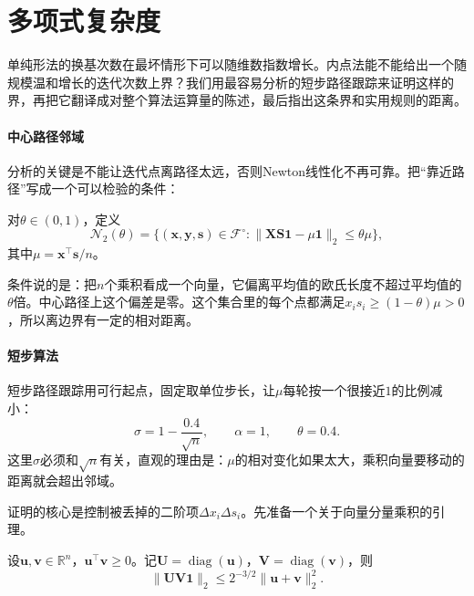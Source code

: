 \section{多项式复杂度}
\label{sec:lpipm-complexity}

单纯形法的换基次数在最坏情形下可以随维数指数增长。内点法能不能给出一个随规模温和增长的迭代次数上界？我们用最容易分析的短步路径跟踪来证明这样的界，再把它翻译成对整个算法运算量的陈述，最后指出这条界和实用规则的距离。

\paragraph{中心路径邻域}
分析的关键是不能让迭代点离路径太远，否则Newton线性化不再可靠。把“靠近路径”写成一个可以检验的条件：

\begin{definition}
\label{def:lpipm-neighborhood}
对$\theta\in(0,1)$，定义
\begin{equation}
 \mathcal{N}_2(\theta)=\bigl\{(\bm{x},\bm{y},\bm{s})\in\mathcal{F}^{\circ}:\lVert\bm{X}\bm{S}\bm{1}-\mu\bm{1}\rVert_2\leq\theta\mu\bigr\},
 \label{eq:lpipm-n2}
\end{equation}
其中$\mu=\bm{x}^\top\bm{s}/n$。
\end{definition}

条件说的是：把$n$个乘积看成一个向量，它偏离平均值的欧氏长度不超过平均值的$\theta$倍。中心路径上这个偏差是零。这个集合里的每个点都满足$x_is_i\geq(1-\theta)\mu>0$，所以离边界有一定的相对距离。

\paragraph{短步算法}
短步路径跟踪用可行起点，固定取单位步长，让$\mu$每轮按一个很接近$1$的比例减小：
\begin{equation}
 \sigma=1-\frac{0.4}{\sqrt{n}},\qquad\alpha=1,\qquad\theta=0.4.
 \label{eq:lpipm-short-step}
\end{equation}
这里$\sigma$必须和$\sqrt{n}$有关，直观的理由是：$\mu$的相对变化如果太大，乘积向量要移动的距离就会超出邻域。

证明的核心是控制被丢掉的二阶项$\Delta x_i\Delta s_i$。先准备一个关于向量分量乘积的引理。

\begin{lemma}[分量乘积的界]
\label{lem:lpipm-product-bound}
设$\bm{u},\bm{v}\in\mathbb{R}^n$，$\bm{u}^\top\bm{v}\geq0$。记$\bm{U}=\operatorname{diag}(\bm{u})$，$\bm{V}=\operatorname{diag}(\bm{v})$，则
\begin{equation}
 \lVert\bm{U}\bm{V}\bm{1}\rVert_2\leq2^{-3/2}\lVert\bm{u}+\bm{v}\rVert_2^2.
 \label{eq:lpipm-product-bound}
\end{equation}
\end{lemma}

